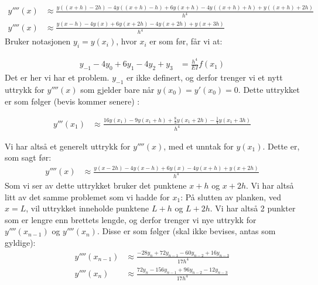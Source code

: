 \begin{align}
	y''''(x)&\approx \frac{y((x+h)-2h)-4y((x+h)-h)+6y(x+h)-4y((x+h)+h)+y((x+h)+2h)}{h^4}\nonumber \\
	y''''(x)&\approx \frac{y(x-h)-4y(x)+6y(x+2h)-4y(x+2h)+y(x+3h)}{h^4}
\end{align}
Bruker notasjonen $y_i=y(x_i)$, hvor $x_i$ er som før, får vi at: 

\begin{align}
    y_{-1}-4y_0+6y_1-4y_2+y_3&=\frac{h^4}{EI}f(x_1)
\end{align}
Det er her vi har et problem. $y_{-1}$ er ikke definert, og derfor trenger vi et nytt uttrykk for $y''''(x)$ som gjelder bare når $y(x_0)=y'(x_0)=0$. Dette uttrykket er som følger (bevis kommer senere) : 

\begin{align}
    y'''(x_1) &\approx \frac{16y(x_1)-9y(x_1+h)+\frac{8}{3}y(x_1+2h)-\frac{1}{4}y(x_1+3h)}{h^4}
\end{align}

Vi har altså et generelt uttrykk for $y''''(x)$, med et unntak for $y(x_1)$. Dette er, som sagt før: 
\begin{align}
     y''''(x)& \approx \frac{y(x-2h)-4y(x-h)+6y(x)-4y(x+h)+y(x+2h)}{h^4}
 \end{align} 
 Som vi ser av dette uttrykket bruker det punktene $x+h$ og $x+2h$. Vi har altså litt av det samme problemet som vi hadde for $x_1$: På slutten av planken, ved $x=L$, vil uttrykket inneholde punktene $L+h$ og $L+2h$. Vi har altså 2 punkter som er lengre enn brettets lengde, og derfor trenger vi nye uttrykk for $y''''(x_{n-1})$ og $y''''(x_n)$. Disse er som følger (skal ikke bevises, antas som gyldige): 
\begin{align}
    y''''(x_{n-1})&\approx \frac{-28y_n+72y_{n-1}-60y_{n-2}+16y_{n-3}}{17h^4} \\
    y''''(x_n)&\approx \frac{72y_n-156y_{n-1}+96y_{n-2}-12y_{n-3}}{17h^4}
\end{align}

